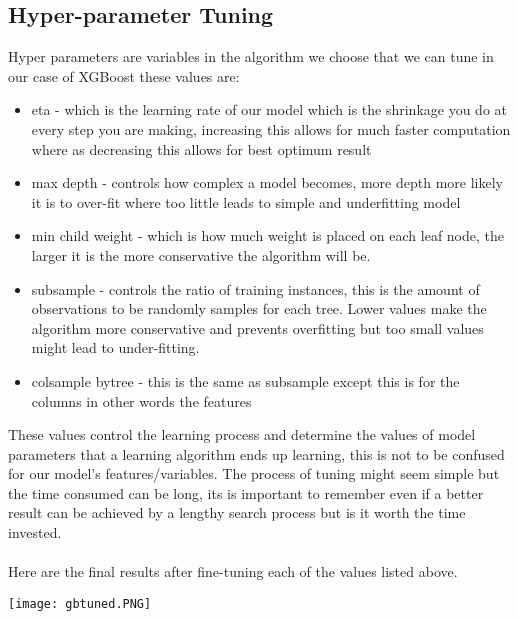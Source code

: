 \documentclass{article}
\begin{document}
\begin{titlepage}
\subsection{Hyper-parameter Tuning}
Hyper parameters are variables in the algorithm we choose that we can tune in our case of XGBoost these values are:
\begin{itemize}
    \item eta - which is the learning rate of our model which is the shrinkage you do at every step you are making, increasing this allows for much faster computation where as decreasing this allows for best optimum result
    \item max depth - controls how complex a model becomes, more depth more likely it is to over-fit where too little leads to simple and underfitting model
    \item min child weight - which is how much weight is placed on each leaf node, the larger it is the more conservative the algorithm will be.
    \item subsample - controls the ratio of training instances, this is the amount of observations to be randomly samples for each tree. Lower values make the algorithm more conservative and prevents overfitting but too small values might lead to under-fitting.
    \item colsample bytree - this is the same as subsample except this is for the columns in other words the features
\end{itemize}

These values control the learning process and determine the values of model parameters that a learning algorithm ends up learning, this is not to be confused for our model's features/variables. The process of tuning might seem simple but the time consumed can be long, its is important to remember even if a better result can be achieved by a lengthy search process but is it worth the time invested. \\
\\
Here are the final results after fine-tuning each of the values listed above.
\begin{center}
\texttt{[image: gbtuned.PNG]}
\end{center}

\end{titlepage}
\end{document}
